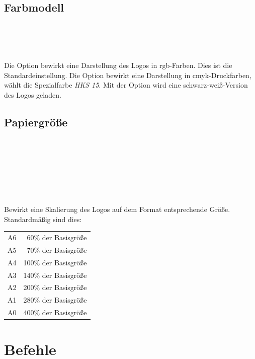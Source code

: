 \subsection{Farbmodell}\label{options:color}

\begin{Declaration}
  \\
  \\
  \\
\end{Declaration}

Die Option  bewirkt eine Darstellung des Logos in rgb-Farben.
Dies ist die Standardeinstellung.
Die Option  bewirkt eine Darstellung in cmyk-Druckfarben,
 wählt die Spezialfarbe \emph{HKS 15}.
Mit der Option  wird eine schwarz-weiß-Version des Logos geladen.

\subsection{Papiergröße}\label{options:papersize}

\begin{Declaration}
  \\
  \\
  \\
  \\
  \\
  \\
\end{Declaration}
Bewirkt eine Skalierung des Logos auf dem Format entsprechende Größe.
Standardmäßig sind dies:

\begin{tabular}{lr}
  A6  & 60\% der Basisgröße   \\
  A5  & 70\% der Basisgröße   \\
  A4  & 100\% der Basisgröße  \\
  A3  & 140\% der Basisgröße  \\
  A2  & 200\% der Basisgröße  \\
  A1  & 280\% der Basisgröße  \\
  A0  & 400\% der Basisgröße   \\
\end{tabular}


\clearpage
\section{Befehle}

